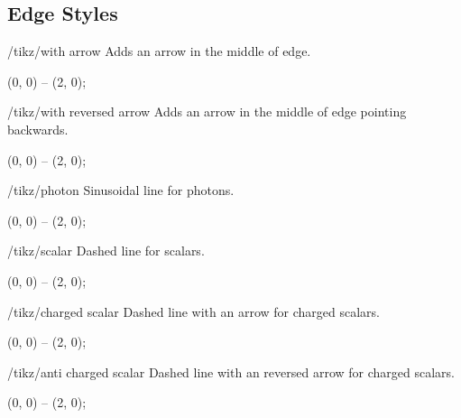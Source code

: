 \documentclass[a4paper,final]{ltxdoc}
\begin{document}
\subsection{Edge Styles}
\label{subsec:edge_styles}

\begin{key}{/tikz/with arrow}
  Adds an arrow in the middle of edge.

\begin{codeexample}[]
\tikz {} (0, 0) -- (2, 0);
\end{codeexample}
\end{key}

\begin{key}{/tikz/with reversed arrow}
  Adds an arrow in the middle of edge pointing backwards.

\begin{codeexample}[]
\tikz {} (0, 0) -- (2, 0);
\end{codeexample}
\end{key}

\begin{key}{/tikz/photon}
  Sinusoidal line for photons.

\begin{codeexample}[]
\tikz \draw[photon] (0, 0) -- (2, 0);
\end{codeexample}
\end{key}

\begin{key}{/tikz/scalar}
  Dashed line for scalars.

\begin{codeexample}[]
\tikz \draw[scalar] (0, 0) -- (2, 0);
\end{codeexample}
\end{key}

\begin{key}{/tikz/charged scalar}
  Dashed line with an arrow for charged scalars.

\begin{codeexample}[]
\tikz {} (0, 0) -- (2, 0);
\end{codeexample}
\end{key}

\begin{key}{/tikz/anti charged scalar}
  Dashed line with an reversed arrow for charged scalars.

\begin{codeexample}[]
\tikz {} (0, 0) -- (2, 0);
\end{codeexample}
\end{key}
\end{document}
